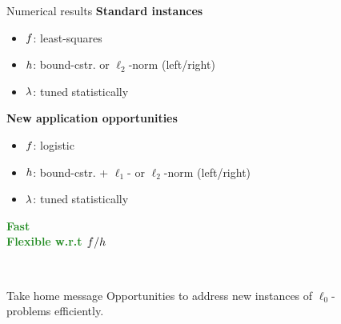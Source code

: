 \documentclass[final]{beamer}
\newlength{\sepwid}
\newlength{\onecolwid}
\begin{document}
\begin{frame}[t]
\begin{columns}[t]
\begin{column}{\sepwid}\end{column}

\begin{column}{\onecolwid}
    \begin{block}{Numerical results}
        \textbf{Standard instances}

        \begin{itemize}[label=$\bullet \ $,leftmargin=2em]
            \item $f$: least-squares
            \item $h$: bound-cstr. or $\ell_2$-norm (left/right)
            \item $\lambda$: tuned statistically
        \end{itemize}
        \begin{figure}
            \centering
            
        \end{figure}
        \vspace*{-1.5cm}
            
        \textbf{New application opportunities}
        \begin{itemize}[label=$\bullet \ $,leftmargin=2em]
            \item $f$: logistic
            \item $h$: bound-cstr. + $\ell_1$- or $\ell_2$-norm (left/right)
            \item $\lambda$: tuned statistically
        \end{itemize}
        \begin{figure}
            \centering
            
        \end{figure}
        \vspace*{-1cm}
        \begin{center}
            \large\textcolor{ForestGreen}{ \textbf{Fast}} \\
            \large\textcolor{ForestGreen}{ \textbf{Flexible w.r.t $f/h$}}
        \end{center}
        ~\\
        \begin{alertblock}{Take home message}
            \centering
            Opportunities to address new instances of $\ell_0$-problems efficiently.
        \end{alertblock}
    \end{block}
\end{column} 

\begin{column}{\sepwid}\end{column}

\end{columns}
\end{frame}
\end{document}
